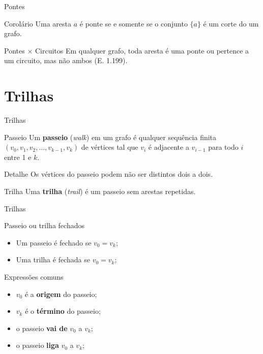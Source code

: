 \documentclass[xcolor=dvipsnames,table]{beamer}
\begin{document}
	\begin{frame}{Pontes}
		\begin{block}{Corolário}
			Uma aresta $a$ é ponte se e somente se o conjunto $\{ a \}$ é um corte do um grafo.
		\end{block} \pause
		\begin{block}{Pontes $\times$ Circuitos}
			Em qualquer grafo, toda aresta é uma ponte ou pertence a um circuito, mas não ambos (E. 1.199).
		\end{block}
	\end{frame}
	
	\section{Trilhas}
	\begin{frame}{Trilhas}
		\begin{block}{Passeio}
	Um {\bf passeio} ({\it walk}) em um grafo é qualquer sequência finita $(v_0, v_1, v_2, \ldots, v_{k-1}, v_k)$ de vértices tal que $v_i$ é adjacente a $v_{i-1}$ para todo $i$ entre 1 e $k$.
		\end{block} \pause
		\begin{block}{Detalhe}
			Os vértices do passeio podem não ser distintos dois a dois.
		\end{block} \pause
		\begin{block}{Trilha}
			Uma {\bf trilha} ({\it trail}) é um passeio sem arestas repetidas.
		\end{block}
	\end{frame}
	
	\begin{frame}{Trilhas}
		\begin{block}{Passeio ou trilha fechados}
			\begin{itemize}
				\item Um passeio é fechado se $v_0 = v_k$;
				\item Uma trilha é fechada se $v_0 = v_k$;
			\end{itemize}			
		\end{block} \pause
		\begin{block}{Expressões comuns}
			\begin{itemize}
				\item $v_0$ é a {\bf origem} do passeio;
				\item $v_k$ é o {\bf término} do passeio;
				\item o passeio {\bf vai de} $v_0$ a $v_k$;
				\item o passeio {\bf liga} $v_0$ a $v_k$;
			\end{itemize}
		\end{block}
	\end{frame}
	
\end{document}
